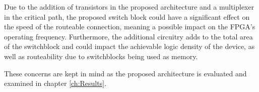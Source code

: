 Due to the addition of transistors in the proposed architecture and a multiplexer in the critical path, the proposed switch block could have a significant effect on the speed of the routeable connection, meaning a possible impact on the FPGA's operating frequency. Furthermore, the additional circuitry adds to the total area of the switchblock and could impact the achievable logic density of the device, as well as routeability due to switchblocks being used as memory. 

These concerns are kept in mind as the proposed architecture is evaluated and examined in chapter \ref{ch:Results}.
